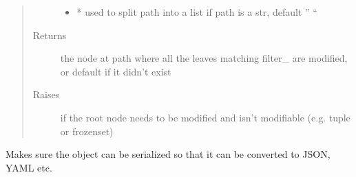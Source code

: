 \documentclass[a4paper,10pt,english]{sphinxmanual}
\begin{document}
\begin{fulllineitems}
\begin{fulllineitems}
\begin{quote}
\begin{description}
\begin{itemize}
\item {}
\sphinxAtStartPar
{} \textendash{} * used to split path into a list if path is a str, default ” “

\end{itemize}

\item[{Returns}] \leavevmode
\sphinxAtStartPar
the node at path where all the leaves matching filter\_ are modified, or default if it didn’t exist

\item[{Raises}] \leavevmode
\sphinxAtStartPar
{} \textendash{} if the root node needs to be modified and isn’t modifiable (e.g. tuple or frozenset)

\end{description}\end{quote}

\end{fulllineitems}


\begin{fulllineitems}
\label{\detokenize{fagus.fagus:fagus.fagus.Fagus.serialize}}
\pysigstartsignatures
{}
\pysigstopsignatures
\sphinxAtStartPar
Makes sure the object can be serialized so that it can be converted to JSON, YAML etc.


\end{fulllineitems}
\end{fulllineitems}
\end{document}
